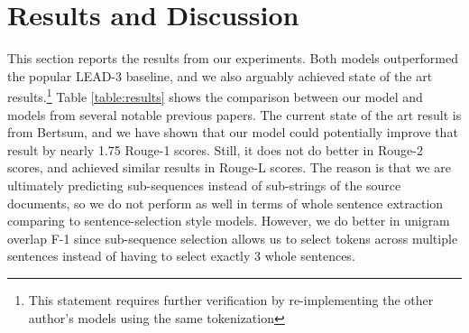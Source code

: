 \documentclass[11pt,a4paper]{article}
\begin{document}
\section{Results and Discussion}
This section reports the results from our experiments. Both models outperformed the popular LEAD-3 baseline, and we also arguably achieved state of the art results.\footnote{This statement requires further verification by re-implementing the other author's models using the same tokenization} Table \ref{table:results} shows the comparison between our model and models from several notable previous papers. The current state of the art result is from Bertsum, and we have shown that our model could potentially improve that result by nearly 1.75 Rouge-1 scores. Still, it does not do better in Rouge-2 scores, and achieved similar results in Rouge-L scores. The reason is that we are ultimately predicting sub-sequences instead of sub-strings of the source documents, so we do not perform as well in terms of whole sentence extraction comparing to sentence-selection style models. However, we do better in unigram overlap F-1 since sub-sequence selection allows us to select tokens across multiple sentences instead of having to select exactly 3 whole sentences.
\end{document}
